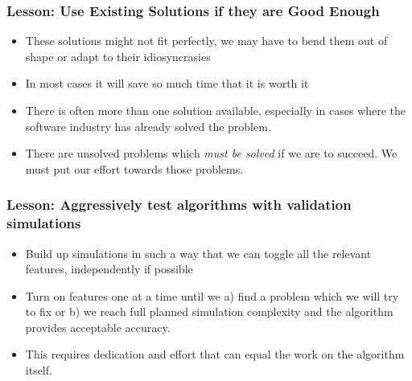\documentclass{beamer}
\begin{document}
\frame
{
    \frametitle{Lesson: Use Existing Solutions if they are Good Enough}


    \begin{itemize}

        \item These solutions might not fit perfectly, we may have to bend
            them out of shape or adapt to their idiosyncrasies

        \item In most cases it will save so much time that it is worth it

        \item There is often more than one solution available, especially in
            cases where the software industry has already solved the problem.

        \item There are unsolved problems which {\em must be solved} if we are
            to succeed.  We must put our effort towards those problems.

    \end{itemize}

}

\frame
{
    \frametitle{Lesson: Aggressively test algorithms with validation simulations}


    \begin{itemize}

        \item Build up simulations in such a way that we can toggle all the
            relevant features, independently if possible

        \item Turn on features one at a time until we a) find a problem which we
            will try to fix or b) we reach full planned simulation complexity
            and the algorithm provides acceptable accuracy.

        \item This requires dedication and effort that can equal the
            work on the algorithm itself.

    \end{itemize}

}
\end{document}
